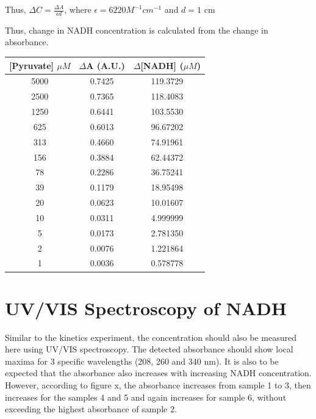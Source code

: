 \documentclass[a4paper,11pt]{article}
\begin{document}
                \begin{center}
                    Thus, $\Delta C = \frac{\Delta A}{\epsilon d}$,
                    where $\epsilon = 6220 M^{-1} cm^{-1}$ and $d = 1$ cm
                \end{center}
                
                Thus, change in NADH concentration is calculated from the change in absorbance.
                \begin{center}
                    \begin{tabular}{ c | c | c }
                        [Pyruvate] $\mu M$ & $\Delta$A (A.U.) & $\Delta$[NADH] ($\mu M$) \\
                        \hline 
                        5000 & 0.7425 & 119.3729 \\
                        2500 & 0.7365 & 118.4083 \\
                        1250 & 0.6441 & 103.5530 \\
                         625 & 0.6013 & 96.67202 \\
                         313 & 0.4660 & 74.91961 \\
                         156 & 0.3884 & 62.44372 \\
                          78 & 0.2286 & 36.75241 \\
                          39 & 0.1179 & 18.95498 \\
                          20 & 0.0623 & 10.01607 \\
                          10 & 0.0311 & 4.999999 \\
                           5 & 0.0173 & 2.781350 \\
                           2 & 0.0076 & 1.221864 \\
                           1 & 0.0036 & 0.578778 \\
                    \end{tabular}
                \end{center}

    \pagebreak

    \section{UV/VIS Spectroscopy of NADH}
    Similar to the kinetics experiment, the concentration should also be measured here using UV/VIS spectroscopy.
    The detected absorbance should show local maxima for 3 specific wavelengths (208, 260 and 340 nm). It is also to be expected that the absorbance also increases with increasing NADH concentration. However, according to figure x, the absorbance increases from sample 1 to 3, then increases for the samples 4 and 5 and again increases for sample 6, without exceeding the highest absorbance of sample 2. 
\end{document}

